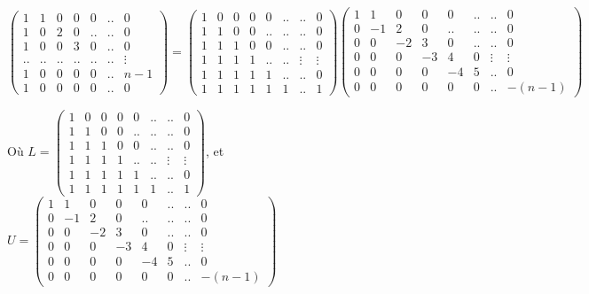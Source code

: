 \documentclass[10pt,a4paper]{article}
\begin{document}
$$\begin{pmatrix}
1 & 1 & 0 & 0 & 0 & .. & 0\\
1 & 0 & 2 & 0 & .. & .. & 0\\
1 & 0 & 0 & 3 & 0 & .. & 0\\
.. & .. & .. & .. & .. & .. & \vdots \\
1 & 0 & 0 & 0 & 0 & .. & n-1\\
1 & 0 & 0 & 0 & 0 & .. & 0
\end{pmatrix}
=\begin{pmatrix}
1 & 0 & 0 & 0 & 0 & .. & .. & 0\\
1 & 1 & 0 & 0 & .. & .. & .. & 0\\
1 & 1 & 1 & 0 & 0 & .. & .. & 0\\
1 & 1 & 1 & 1 & .. & .. & \vdots & \vdots \\
1 & 1 & 1 & 1 & 1 & .. & .. & 0\\
1 & 1 & 1 & 1 & 1 & 1 & .. & 1
\end{pmatrix}
\begin{pmatrix}
1 & 1 & 0 & 0 & 0 & .. & .. & 0\\
0 & -1 & 2 & 0 & .. & .. & .. & 0\\
0 & 0 & -2 & 3 & 0 & .. & .. & 0\\
0 & 0 & 0 & -3 & 4 & 0 & \vdots & \vdots \\
0 & 0 & 0 & 0 & -4 & 5 & .. & 0\\
0 & 0 & 0 & 0 & 0 & 0 & .. & -(n-1)
\end{pmatrix}$$

Où $L=\begin{pmatrix}
1 & 0 & 0 & 0 & 0 & .. & .. & 0\\
1 & 1 & 0 & 0 & .. & .. & .. & 0\\
1 & 1 & 1 & 0 & 0 & .. & .. & 0\\
1 & 1 & 1 & 1 & .. & .. & \vdots & \vdots \\
1 & 1 & 1 & 1 & 1 & .. & .. & 0\\
1 & 1 & 1 & 1 & 1 & 1 & .. & 1
\end{pmatrix}$, et $U=\begin{pmatrix}
1 & 1 & 0 & 0 & 0 & .. & .. & 0\\
0 & -1 & 2 & 0 & .. & .. & .. & 0\\
0 & 0 & -2 & 3 & 0 & .. & .. & 0\\
0 & 0 & 0 & -3 & 4 & 0 & \vdots & \vdots \\
0 & 0 & 0 & 0 & -4 & 5 & .. & 0\\
0 & 0 & 0 & 0 & 0 & 0 & .. & -(n-1)
\end{pmatrix}$
\linebreak
\end{document}
